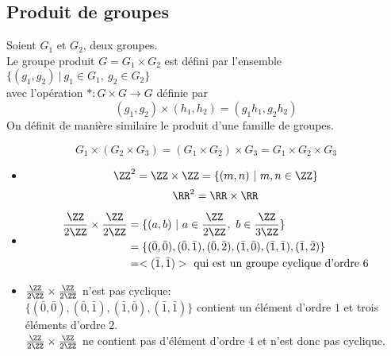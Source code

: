 \documentclass[../main.tex]{subfile}
\begin{document}
\subsection{Produit de groupes}

Soient $G_1$ et $G_2$, deux groupes.\\
Le groupe produit $G = G_1 \times G_2$ est défini par l'ensemble $\{(g_1, g_2) \ | \ g_1 \in G_1,\ g_2 \in G_2\}$\\
avec l'opération $* : G \times G \to G$ définie par 
$$(g_1, g_2) \times (h_1, h_2) = (g_1h_1, g_2h_2)$$
On définit de manière similaire le produit d'une famille de groupes.\\

\begin{rema}
	$$G_1 \times (G_2 \times G_3) = (G_1 \times G_2) \times G_3 = G_1 \times G_2 \times G_3$$
\end{rema}

\begin{ex}
\begin{itemize}	
	\item $$\ZZ^2 = \ZZ \times \ZZ = \{(m, n) \ | \ m, n \in \ZZ\}$$
	$$\RR^2 = \RR \times \RR$$

	\item
	$$
\begin{aligned}	
	\frac{\ZZ}{2\ZZ} \times \frac{\ZZ}{2\ZZ} &= \{(a, b) \ | \ a \in \frac{\ZZ}{2\ZZ} , \ b \in \frac{\ZZ}{3\ZZ}\}\\
	&= \{(\bar{0}, \bar{0}), (\bar{0}, \bar{1}), (\bar{0}, \bar{2}), (\bar{1}, \bar{0}), (\bar{1}, \bar{1}), (\bar{1}, \bar{2})\}\\
	&= <(\bar{1}, \bar{1})> \ \text{qui est un groupe cyclique d'ordre 6}
\end{aligned}
	$$

	\item $\frac{\ZZ}{2\ZZ} \times \frac{\ZZ}{2\ZZ}$ n'est pas cyclique:\\
	$\{(\bar{0}, \bar{0}), (\bar{0}, \bar{1}), (\bar{1}, \bar{0}), (\bar{1}, \bar{1})\}$ contient un élément d'ordre $1$ et trois éléments d'ordre $2$.\\
	$\frac{\ZZ}{2\ZZ} \times \frac{\ZZ}{2\ZZ}$ ne contient pas d'élément d'ordre $4$ et n'est donc pas cyclique.
\end{itemize}
\end{ex}
\end{document}
